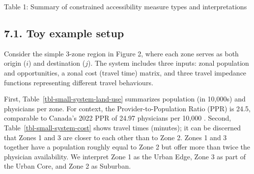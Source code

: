 \documentclass[
  10pt,
  letterpaper,
]{article}
\newcommand{\blandscape}{\begin{landscape}}
\newcommand{\elandscape}{\end{landscape}}
\begin{document}
\blandscape

Table 1: Summary of constrained accessibility measure types and
interpretations



\elandscape

\subsection{7.1. Toy example setup}\label{toy-example-setup}

Consider the simple 3-zone region in Figure 2, where each zone serves as
both origin (\(i\)) and destination (\(j\)). The system includes three
inputs: zonal population and opportunities, a zonal cost (travel time)
matrix, and three travel impedance functions representing different
travel behaviours.

First, Table~\ref{tbl-small-system-land-use} summarizes population (in
10,000s) and physicians per zone. For context, the
Provider-to-Population Ratio (PPR) is 24.5, comparable to Canada's 2022
PPR of 24.97 physicians per 10,000 \citep{whoMedicalDoctors102025}.
Second, Table~\ref{tbl-small-system-cost} shows travel times (minutes);
it can be discerned that Zones 1 and 3 are closer to each other than to
Zone 2. Zones 1 and 3 together have a population roughly equal to Zone 2
but offer more than twice the physician availability. We interpret Zone
1 as the Urban Edge, Zone 3 as part of the Urban Core, and Zone 2 as
Suburban.

\begin{table}

\caption{\label{tbl-small-system-land-use}Simple system with three zones
(ID 1, 2 and 3). Population is in 10,000 persons and opportunities in
number of physicians.}


\end{table}%
\end{document}
